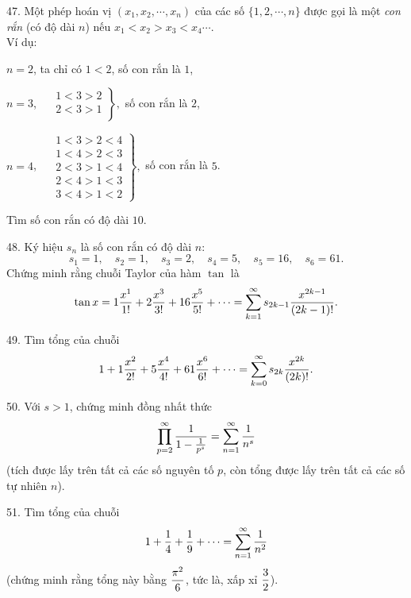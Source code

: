 \begin{problem}{47.}
	Một phép hoán vị $(x_1, x_2, \cdots,x_n)$ của các số $\{1,2,\cdots,n\}$ được gọi là một  \emph{con rắn} (có độ dài $n$) nếu  $ x_1 < x_2 > x_3 < x_4\cdots $.\\
	Ví dụ:

	$n=2$, ta chỉ có $1<2$, số con rắn là $1$,

	$n=3$, $ \quad  \left.\begin{matrix}
	1<3>2\\
	2<3>1\\
	\end{matrix}\right\}, $  số con rắn là $2$,

	$n=4$, $\quad \left. \begin{matrix}
	1 < 3 > 2 < 4\\
	1 < 4 > 2 < 3\\
	2 < 3 > 1 < 4\\
	2 < 4 > 1 < 3\\
	3 < 4 > 1 < 2
	\end{matrix} \right\},$  số con rắn là $5$.

	Tìm số con rắn có độ dài $10$.
\end{problem}

\begin{problem}{48.}
	Ký hiệu $s_n$ là số con rắn có độ dài $n$:
	$$ s_1=1, \quad s_2=1, \quad s_3=2, \quad s_4=5, \quad s_5=16, \quad s_6=61. $$
	Chứng minh rằng chuỗi Taylor của hàm $\tan$ là
	$$ \tan x = 1 \dfrac{x^{1}}{1!}+ 2 \dfrac{x^{3}}{3!}+16 \dfrac{x^{5}}{5!}+\cdots = \sum_{k=1}^{\infty}s_{2k-1} \dfrac{x^{2k-1}}{(2k-1)!}.$$
\end{problem}

\begin{problem}{49.}
	Tìm tổng của chuỗi
	$$ 1 + 1 \dfrac{x^{2}}{2!}+ 5 \dfrac{x^{4}}{4!}+61 \dfrac{x^{6}}{6!}+\cdots = \sum_{k=0}^{\infty}s_{2k} \dfrac{x^{2k}}{(2k)!}.$$
\end{problem}

\begin{problem}{50.}
	Với $s>1$, chứng minh đồng nhất thức
	$$ \prod_{p=2}^{\infty} \dfrac{1}{1-\tfrac{1}{p^{s}}} = \sum_{n=1}^{\infty} \dfrac{1}{n^{s}} $$
	(tích được lấy trên tất cả các số nguyên tố $p$, còn tổng được lấy trên tất cả các số tự nhiên $n$).
\end{problem}

\begin{problem}{51.}
	Tìm tổng của chuỗi
	$$ 1 + \dfrac{1}{4} + \dfrac{1}{9}+ \cdots = \sum_{n=1}^{\infty} \dfrac{1}{n^{2}} $$
	(chứng minh rằng tổng này bằng $\dfrac{\pi^{2}}{6}$, tức là,  xấp xỉ $\dfrac{3}{2}$).
\end{problem}

